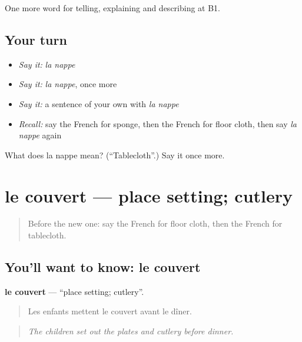 \begin{grammarlens}[title={What you've built}]
One more word for telling, explaining and describing at B1.
\end{grammarlens}

\subsection*{Your turn}
\begin{itemize}
\raggedright
  \item \emph{Say it:} \emph{la nappe}
  \item \emph{Say it:} \emph{la nappe}, once more
  \item \emph{Say it:} a sentence of your own with \emph{la nappe}
  \item \emph{Recall:} say the French for sponge, then the French for floor cloth, then say \emph{la nappe} again
\end{itemize}

\begin{tcolorbox}[breakable,colback=teal!4,colframe=teal!35!black,title={Before you move on}]
What does la nappe mean? (\textquotedblleft{}Tablecloth\textquotedblright{}.) Say it once more.
\end{tcolorbox}
\section[le couvert]{le couvert — place setting; cutlery}

\label{lesson:FR-C529-couvert}



\begin{quote}
Before the new one: say the French for floor cloth, then the French for tablecloth.
\end{quote}

\subsection*{You'll want to know: le couvert}
\textbf{le couvert} — \textquotedblleft{}place setting; cutlery\textquotedblright{}.

\begin{quote}
Les enfants mettent le couvert avant le dîner.
\end{quote}

\begin{quote}
\emph{The children set out the plates and cutlery before dinner.}
\end{quote}

